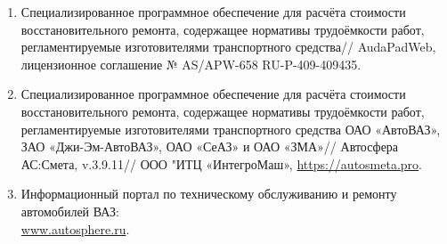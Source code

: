 \begin{enumerate}
{Трудоемкости работ по техническому обслуживанию и ремонту автомобилей автомобилей Lada  Granta}/   \url{https://docplayer.ru/30250248-Trudoemkosti-rabot-po-teh\-nicheskomu-obsluzhivaniyu-i-remontu-avtomobiley-lada- granta.html}.
%
%
\item
{Специализированное программное обеспечение для расчёта стоимости  восстановительного ремонта, содержащее нормативы трудоёмкости работ, регламентируемые изготовителями транспортного средства}//   AudaPadWeb, лицензионное соглашение № AS/APW-658  RU-P-409-409435.
%
%
%
\item
{Специализированное программное обеспечение для расчёта стоимости  восстановительного ремонта, содержащее нормативы трудоёмкости работ, регламентируемые изготовителями транспортного средства ОАО «АвтоВАЗ», ЗАО «Джи-Эм-АвтоВАЗ», ОАО «СеАЗ» и ОАО «ЗМА»}//   Автосфера АС:Смета, v.3.9.11// ООО "ИТЦ «ИнтегроМаш», \url{https://autosmeta.pro}.
%
%
%
\item Информационный портал по техническому обслуживанию и ремонту автомобилей	 ВАЗ:\\ \url{www.autosphere.ru}.

\end{enumerate}
